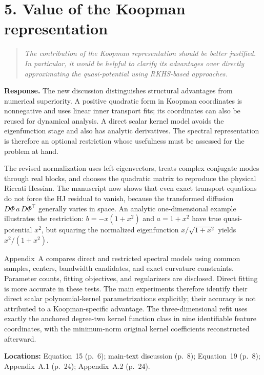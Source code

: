 \documentclass[11pt]{article}
\newcommand{\comment}[1]{\begin{quote}\small\itshape #1\end{quote}}
\begin{document}
\section*{5. Value of the Koopman representation}
\comment{The contribution of the Koopman representation should be better justified. In particular, it would be helpful to clarify its advantages over directly approximating the quasi-potential using RKHS-based approaches.}

\textbf{Response.} The new discussion distinguishes structural advantages from numerical superiority. A positive quadratic form in Koopman coordinates is nonnegative and uses linear inner transport fits; its coordinates can also be reused for dynamical analysis. A direct scalar kernel model avoids the eigenfunction stage and also has analytic derivatives. The spectral representation is therefore an optional restriction whose usefulness must be assessed for the problem at hand.

The revised normalization uses left eigenvectors, treats complex conjugate modes through real blocks, and chooses the quadratic matrix to reproduce the physical Riccati Hessian. The manuscript now shows that even exact transport equations do not force the HJ residual to vanish, because the transformed diffusion $D\Phi\,a\,D\Phi^\top$ generally varies in space. An analytic one-dimensional example illustrates the restriction: $b=-x(1+x^2)$ and $a=1+x^2$ have true quasi-potential $x^2$, but squaring the normalized eigenfunction $x/\sqrt{1+x^2}$ yields $x^2/(1+x^2)$.

Appendix~A compares direct and restricted spectral models using common samples, centers, bandwidth candidates, and exact curvature constraints. Parameter counts, fitting objectives, and regularizers are disclosed. Direct fitting is more accurate in these tests. The main experiments therefore identify their direct scalar polynomial-kernel parametrizations explicitly; their accuracy is not attributed to a Koopman-specific advantage. The three-dimensional refit uses exactly the anchored degree-two kernel function class in nine identifiable feature coordinates, with the minimum-norm original kernel coefficients reconstructed afterward.

\textbf{Locations:} Equation~15 (p.~6); main-text discussion (p.~8); Equation~19 (p.~8); Appendix~A.1 (p.~24); Appendix~A.2 (p.~24).
\end{document}
